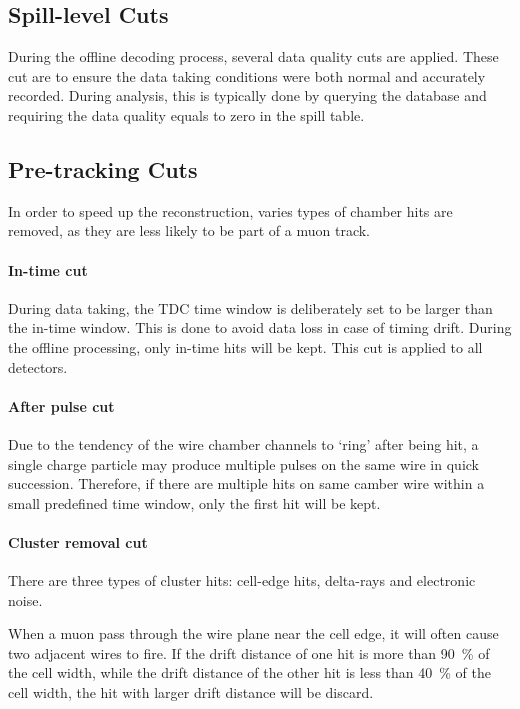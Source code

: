 \documentclass[../main.tex]{subfiles}
\begin{document}
\subsection{Spill-level Cuts}
During the offline decoding process, several data quality cuts are applied.
These cut are to ensure the data taking conditions were both normal and accurately recorded.
During analysis, this is typically done by querying the database
and requiring the data quality equals to zero in the spill table.

\subsection{Pre-tracking Cuts}
In order to speed up the reconstruction, varies types of chamber hits are removed, as
they are less likely to be part of a muon track.

\paragraph{In-time cut}
During data taking, the TDC time window is deliberately set to be larger than the in-time
window. This is done to avoid data loss in case of timing drift\cite{daniel-4924}.
During the offline processing, only in-time hits will be kept. This cut is applied to
all detectors.

\paragraph{After pulse cut}
Due to the tendency of the wire chamber channels to `ring' after being hit,
a single charge particle may produce multiple pulses on the same
wire in quick succession. Therefore, if there are multiple hits on same camber wire
within a small predefined time window, only the first hit will be kept.

\paragraph{Cluster removal cut}
There are three types of cluster hits: cell-edge hits, delta-rays and electronic noise.

When a muon pass through the wire plane near the cell edge, it will often cause two adjacent
wires to fire. If the drift distance of one hit is more than \SI{90}{\percent} of the cell width,
while the drift distance of the other hit is less than \SI{40}{\percent} of the cell width, the hit
with larger drift distance will be discard.
\end{document}
